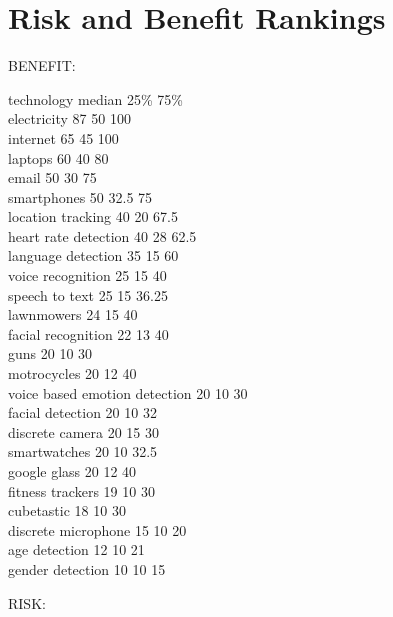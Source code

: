 \documentclass{acm_proc_article-sp}
\begin{document}
\section{Risk and Benefit Rankings}
\label{sec:techrank}

BENEFIT: 

technology 	median	25\%		75\% \\
electricity	87	50	100\\
internet	65	45	100\\
laptops	60	40	80\\
email	50	30	75\\
smartphones	50	32.5	75\\
location tracking	40	20	67.5\\
heart rate detection	40	28	62.5\\
language detection	35	15	60\\
voice recognition	25	15	40\\
speech to text	25	15	36.25\\
lawnmowers	24	15	40\\
facial recognition	22	13	40\\
guns	20	10	30\\
motrocycles	20	12	40\\
voice based emotion detection	20	10	30\\
facial detection	20	10	32\\
discrete camera	20	15	30\\
smartwatches	20	10	32.5\\
google glass	20	12	40\\
fitness trackers	19	10	30\\
cubetastic	18	10	30\\
discrete microphone	15	10	20\\
age detection	12	10	21\\
gender detection	10	10	15

RISK: 
\end{document}
